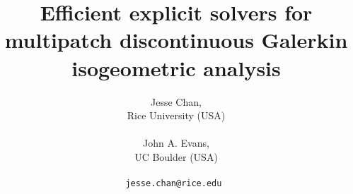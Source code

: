 \documentclass[a4paper]{article} %
\date{} %
\begin{document}
\title{Efficient explicit solvers for multipatch discontinuous Galerkin isogeometric analysis}

\author{Jesse Chan, \\ %
       Rice University (USA) \\ \\ %
       John A. Evans, \\ %
       UC Boulder (USA) \\ \\ %
       \tt{jesse.chan@rice.edu} %
       }%


\maketitle

\thispagestyle{empty}

\end{document}
